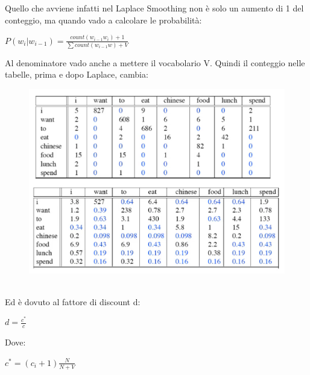 Quello che avviene infatti nel Laplace Smoothing non è solo un aumento di 1 del conteggio, ma quando vado a calcolare le probabilità:
\begin{center}
    \begin{math}
        P(w_i | w_{i-1}) = \frac{count(w_{i-1}w_i) + 1}{\sum count(w_{i-1}w) + V}
    \end{math}
\end{center}
Al denominatore vado anche a mettere il vocabolario V. Quindi il conteggio nelle tabelle, prima e dopo Laplace, cambia: 
\\
\begin{figure}[th]
    \centering
    \includegraphics[scale=0.45]{Text Analysis/img/compare.png}
\end{figure}
\\
Ed è dovuto al fattore di discount d:
\begin{center}
    \begin{math}
        d = \frac{c^*}{c} 
    \end{math}
\end{center}
Dove:
\begin{center}
    \begin{math}
        c^* = (c_i+1)\frac{N}{N+V} 
    \end{math}
\end{center}

\newpage

